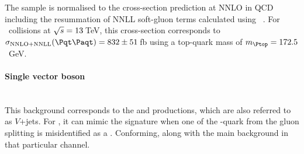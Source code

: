 
\begin{comment} %
The uncertainty due to ISR is estimated 
by comparing the nominal \ttbar events using the A14 tune with \ttbar events with the same 
settings as the nominal ones, but employed the \texttt{Var3c up} or \texttt{down} variation 
of the A14 tune, which corresponds to the variation of \alphas for ISR in the A14 
tune~\cite{ATL-PHYS-PUB-2014-021}. The uncertainty due to FSR 
is evaluated by varying the $\mu_{\text{R}}$ scale for emissions from the PS up and down by a 
factor of two.
\end{comment}

The \ttbar sample is normalised to the cross-section prediction at NNLO
in QCD including the resummation of NNLL soft-gluon terms calculated using
\TOPpp[2.0]~\cite{Beneke:2011mq,Cacciari:2011hy,Baernreuther:2012ws,Czakon:2012zr,Czakon:2012pz,Czakon:2011xx}.
For \pp\ collisions at \(\sqrt{s} = 13\,\)TeV, this cross-section corresponds to
\(\sigma_{\text{NNLO+NNLL}} (\ttbar)= 832 \pm 51\,\)fb using a top-quark mass of $\mtop = 172.5$~GeV.



\paragraph{Single vector boson}\mbox{}\\
This background corresponds to the \Zjets and \Wjets productions, which are also referred
to as \(V\)+jets.
For \Zjets, it can mimic the \dilepOStau %
 signature when one of the \Pbottom-quark from the gluon splitting is misidentified as
 a \tauhad. Conforming, along with \ttbar the main background in that particular channel.
 
 

